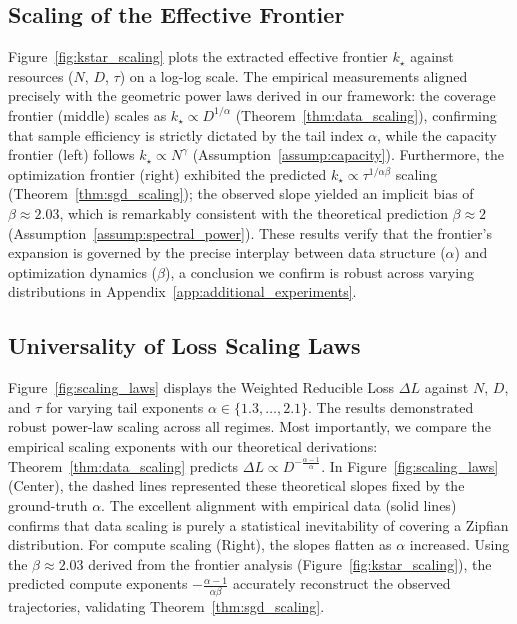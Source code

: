 \documentclass{article}
\theoremstyle{plain}
\theoremstyle{definition}
\theoremstyle{remark}
\begin{document}
\subsection{Scaling of the Effective Frontier}
\label{sec:scaling_frontier}
Figure~\ref{fig:kstar_scaling} plots the extracted effective frontier $k_\star$ against resources ($N$, $D$, $\tau$) on a log-log scale. The empirical measurements aligned precisely with the geometric power laws derived in our framework: the coverage frontier (middle) scales as $k_\star \propto D^{1/\alpha}$ (Theorem~\ref{thm:data_scaling}), confirming that sample efficiency is strictly dictated by the tail index $\alpha$, while the capacity frontier (left) follows $k_\star \propto N^\gamma$ (Assumption~\ref{assump:capacity}). Furthermore, the optimization frontier (right) exhibited the predicted $k_\star \propto \tau^{1/\alpha\beta}$ scaling (Theorem~\ref{thm:sgd_scaling}); the observed slope yielded an implicit bias of $\beta \approx 2.03$, which is remarkably consistent with the theoretical prediction $\beta \approx 2$ (Assumption~\ref{assump:spectral_power}). These results verify that the frontier's expansion is governed by the precise interplay between data structure ($\alpha$) and optimization dynamics ($\beta$), a conclusion we confirm is robust across varying distributions in Appendix~\ref{app:additional_experiments}.

\subsection{Universality of Loss Scaling Laws}
Figure~\ref{fig:scaling_laws} displays the Weighted Reducible Loss $\Delta L$ against  $N$, $D$, and $\tau$ for varying tail exponents $\alpha \in \{1.3, \dots, 2.1\}$. The results demonstrated robust power-law scaling across all regimes. Most importantly, we compare the empirical scaling exponents with our theoretical derivations: Theorem~\ref{thm:data_scaling} predicts $\Delta L \propto D^{-\frac{\alpha-1}{\alpha}}$. In Figure~\ref{fig:scaling_laws} (Center), the dashed lines represented these theoretical slopes fixed by the ground-truth $\alpha$. The excellent alignment with empirical data (solid lines) confirms that data scaling is purely a statistical inevitability of covering a Zipfian distribution. For compute scaling (Right), the slopes flatten as $\alpha$ increased. Using the $\beta \approx 2.03$ derived from the frontier analysis (Figure~\ref{fig:kstar_scaling}), the predicted compute exponents $-\frac{\alpha-1}{\alpha\beta}$ accurately reconstruct the observed trajectories, validating Theorem~\ref{thm:sgd_scaling}. 
\end{document}
